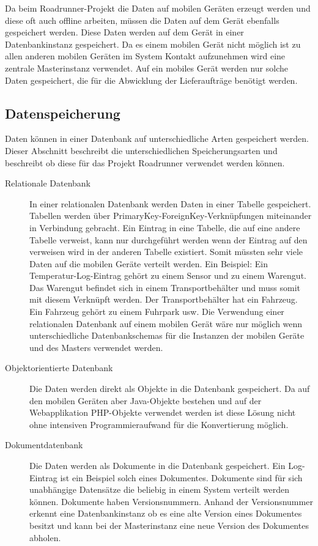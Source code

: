 Da beim Roadrunner-Projekt die Daten auf mobilen Geräten erzeugt werden und diese oft auch offline arbeiten, müssen die Daten auf dem Gerät ebenfalls gespeichert werden. Diese Daten werden auf dem Gerät in einer Datenbankinstanz gespeichert. Da es einem mobilen Gerät nicht möglich ist zu allen anderen mobilen Geräten im System Kontakt aufzunehmen wird eine zentrale Masterinstanz verwendet. Auf ein mobiles Gerät werden nur solche Daten gespeichert, die für die Abwicklung der Lieferaufträge benötigt werden.

\subsection{Datenspeicherung}

Daten können in einer Datenbank auf unterschiedliche Arten gespeichert werden. Dieser Abschnitt beschreibt die unterschiedlichen Speicherungsarten und beschreibt ob diese für das Projekt Roadrunner verwendet werden können.

\begin{description}
	\item[Relationale Datenbank] In einer relationalen Datenbank werden Daten in einer Tabelle gespeichert. Tabellen werden über PrimaryKey-ForeignKey-Verknüpfungen miteinander in Verbindung gebracht. Ein Eintrag in eine Tabelle, die auf eine andere Tabelle verweist, kann nur durchgeführt werden wenn der Eintrag auf den verweisen wird in der anderen Tabelle existiert. Somit müssten sehr viele Daten auf die mobilen Geräte verteilt werden. Ein Beispiel: Ein Temperatur-Log-Eintrag gehört zu einem Sensor und zu einem Warengut. Das Warengut befindet sich in einem Transportbehälter und muss somit mit diesem Verknüpft werden. Der Transportbehälter hat ein Fahrzeug. Ein Fahrzeug gehört zu einem Fuhrpark usw. Die Verwendung einer relationalen Datenbank auf einem mobilen Gerät wäre nur möglich wenn unterschiedliche Datenbankschemas für die Instanzen der mobilen Geräte und des Masters verwendet werden. 
	\item[Objektorientierte Datenbank] Die Daten werden direkt als Objekte in die Datenbank gespeichert. Da auf den mobilen Geräten aber Java-Objekte bestehen und auf der Webapplikation PHP-Objekte verwendet werden ist diese Lösung nicht ohne intensiven Programmieraufwand für die Konvertierung möglich.
	\item[Dokumentdatenbank] Die Daten werden als Dokumente in die Datenbank gespeichert. Ein Log-Eintrag ist ein Beispiel solch eines Dokumentes. Dokumente sind für sich unabhängige Datensätze die beliebig in einem System verteilt werden können. Dokumente haben Versionsnummern. Anhand der Versionsnummer erkennt eine Datenbankinstanz ob es eine alte Version eines Dokumentes besitzt und kann bei der Masterinstanz eine neue Version des Dokumentes abholen.
\end{description}

